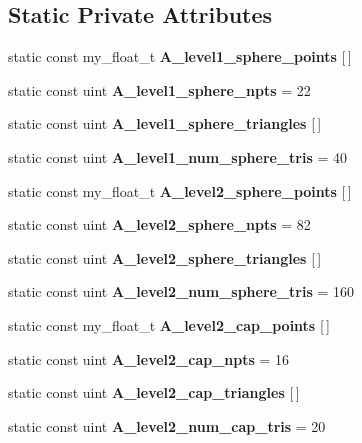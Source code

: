 \subsection*{Static Private Attributes}
\begin{CompactItemize}
\item 
static const my\_\-float\_\-t \textbf{A\_\-level1\_\-sphere\_\-points} [$\,$]
\item 
static const uint \textbf{A\_\-level1\_\-sphere\_\-npts} = 22\label{classASCbase_1_1geometry_1_1TriMeshSphere_6c2549e9daacf27c7cf15cb3eb7b7373}

\item 
static const uint \textbf{A\_\-level1\_\-sphere\_\-triangles} [$\,$]\label{classASCbase_1_1geometry_1_1TriMeshSphere_278a1d74c086e8ebc40ef05d74b9ea15}

\item 
static const uint \textbf{A\_\-level1\_\-num\_\-sphere\_\-tris} = 40\label{classASCbase_1_1geometry_1_1TriMeshSphere_e42055072b403bf91bb04dfe81b8a77c}

\item 
static const my\_\-float\_\-t \textbf{A\_\-level2\_\-sphere\_\-points} [$\,$]\label{classASCbase_1_1geometry_1_1TriMeshSphere_9218b68dfd06e39789b926138618dfeb}

\item 
static const uint \textbf{A\_\-level2\_\-sphere\_\-npts} = 82\label{classASCbase_1_1geometry_1_1TriMeshSphere_6c493b2654c01b707878f88a76cb12bb}

\item 
static const uint \textbf{A\_\-level2\_\-sphere\_\-triangles} [$\,$]\label{classASCbase_1_1geometry_1_1TriMeshSphere_334f79d29df15c86e07a9b2f771436b5}

\item 
static const uint \textbf{A\_\-level2\_\-num\_\-sphere\_\-tris} = 160\label{classASCbase_1_1geometry_1_1TriMeshSphere_e8608fc384f66ad810567214a8a65328}

\item 
static const my\_\-float\_\-t \textbf{A\_\-level2\_\-cap\_\-points} [$\,$]
\item 
static const uint \textbf{A\_\-level2\_\-cap\_\-npts} = 16\label{classASCbase_1_1geometry_1_1TriMeshSphere_72717de0132dc9de41615e95777e78d1}

\item 
static const uint \textbf{A\_\-level2\_\-cap\_\-triangles} [$\,$]
\item 
static const uint \textbf{A\_\-level2\_\-num\_\-cap\_\-tris} = 20\label{classASCbase_1_1geometry_1_1TriMeshSphere_852532701e612513420c5cfcee27edfc}

\end{CompactItemize}


